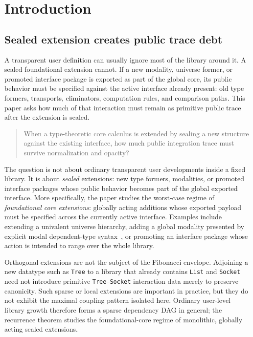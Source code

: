 \documentclass{lmcs}
\begin{document}
\section{Introduction}
\label{sec:introduction}

\subsection{Sealed extension creates public trace debt}

A transparent user definition can usually ignore most of the library around it. A sealed foundational extension cannot. If a new modality, universe former, or promoted interface package is exported as part of the global core, its public behavior must be specified against the active interface already present: old type formers, transports, eliminators, computation rules, and comparison paths. This paper asks how much of that interaction must remain as primitive public trace after the extension is sealed.

\begin{quote}
When a type-theoretic core calculus is extended by sealing a new structure against the existing interface, how much public integration trace must survive normalization and opacity?
\end{quote}

The question is not about ordinary transparent user developments inside a fixed library. It is about \emph{sealed} extensions: new type formers, modalities, or promoted interface packages whose public behavior becomes part of the global exported interface. More specifically, the paper studies the worst-case regime of \emph{foundational core extensions}: globally acting additions whose exported payload must be specified across the currently active interface. Examples include extending a univalent universe hierarchy, adding a global modality presented by explicit modal dependent-type syntax~\cite{birkedal-modal-dtt,aagaard-cubical-mtt}, or promoting an interface package whose action is intended to range over the whole library.

Orthogonal extensions are not the subject of the Fibonacci envelope. Adjoining a new datatype such as \texttt{Tree} to a library that already contains \texttt{List} and \texttt{Socket} need not introduce primitive \texttt{Tree}--\texttt{Socket} interaction data merely to preserve canonicity. Such sparse or local extensions are important in practice, but they do not exhibit the maximal coupling pattern isolated here. Ordinary user-level library growth therefore forms a sparse dependency DAG in general; the recurrence theorem studies the foundational-core regime of monolithic, globally acting sealed extensions.
\end{document}
